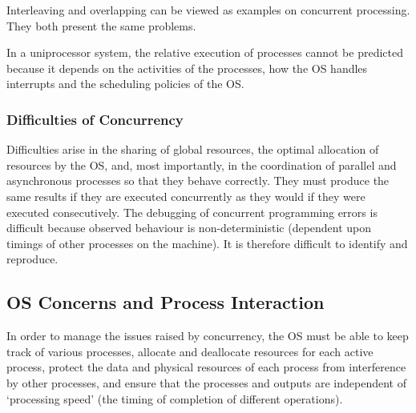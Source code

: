 Interleaving and overlapping can be viewed as examples on concurrent processing.
They both present the same problems.

In a uniprocessor system, the relative execution of processes cannot be predicted because it depends on the activities of the processes, how the OS handles interrupts and the scheduling policies of the OS.

\subsubsection{Difficulties of Concurrency}

Difficulties arise in the sharing of global resources, the optimal allocation of resources by the OS, and, most importantly, in the coordination of parallel and asynchronous processes so that they behave correctly.
They must produce the same results if they are executed concurrently as they would if they were executed consecutively.
The debugging of concurrent programming errors is difficult because observed behaviour is non-deterministic (dependent upon timings of other processes on the machine).
It is therefore difficult to identify and reproduce.

\subsection{OS Concerns and Process Interaction}

In order to manage the issues raised by concurrency, the OS must be able to keep track of various processes, allocate and deallocate resources for each active process, protect the data and physical resources of each process from interference by other processes, and ensure that the processes and outputs are independent of `processing speed' (the timing of completion of different operations).


